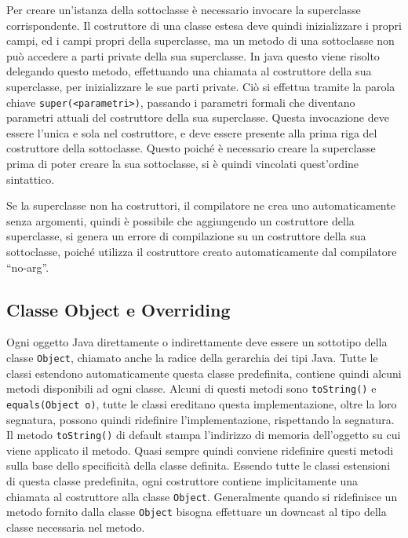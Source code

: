 \documentclass{article}
\numberwithin{equation}{subsection}
\begin{document}

Per creare un'istanza della sottoclasse è necessario invocare la superclasse corrispondente. Il costruttore di una classe estesa deve quindi inizializzare i propri campi, ed i 
campi propri della superclasse, ma un metodo di una sottoclasse non può accedere a parti private della sua superclasse. In java questo viene risolto delegando questo metodo, 
effettuando una chiamata al costruttore della sua superclasse, per inizializzare le sue parti private. Ciò si effettua tramite la parola chiave \verb|super(<parametri>)|, 
passando i parametri formali che diventano parametri attuali del costruttore della sua superclasse. Questa invocazione deve essere l'unica e sola nel costruttore, e deve 
essere presente alla prima riga del costruttore della sottoclasse. Questo poiché è necessario creare la superclasse prima di poter creare la sua sottoclasse, si è quindi vincolati 
quest'ordine sintattico. 

Se la superclasse non ha costruttori, il compilatore ne crea uno automaticamente senza argomenti, quindi è possibile che aggiungendo un costruttore della superclasse, si 
genera un errore di compilazione su un costruttore della sua sottoclasse, poiché utilizza il costruttore creato automaticamente dal compilatore ``no-arg''. 

\subsection{Classe Object e Overriding}

Ogni oggetto Java direttamente o indirettamente deve essere un sottotipo della classe \verb|Object|, chiamato anche la radice della gerarchia dei tipi Java.
Tutte le classi estendono automaticamente questa classe predefinita, contiene quindi alcuni metodi disponibili ad ogni classe. 
Alcuni di questi metodi sono \verb|toString()| e \verb|equals(Object o)|, tutte le classi ereditano questa implementazione, oltre la loro segnatura, possono quindi ridefinire 
l'implementazione, rispettando la segnatura. Il metodo \verb|toString()| di default stampa l'indirizzo di memoria dell'oggetto su cui viene applicato il metodo. 
Quasi sempre quindi conviene ridefinire questi metodi sulla base dello specificità della classe definita. 
Essendo tutte le classi estensioni di questa classe predefinita, ogni costruttore contiene implicitamente una chiamata al costruttore alla classe \verb|Object|. 
Generalmente quando si ridefinisce un metodo fornito dalla classe \verb|Object| bisogna effettuare un downcast al tipo della classe necessaria nel metodo. 
\end{document}
